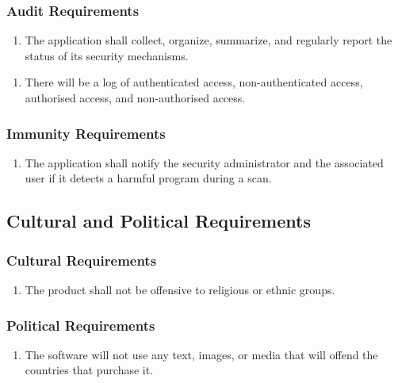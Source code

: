 \documentclass[]{article}
\begin{document}
\subsubsection{Audit Requirements}
\label{ssub:audit_requirements}
\begin{enumerate}[{SR}1. ]
	\item The application shall collect, organize, summarize, and regularly report the status of its security mechanisms.
\end{enumerate}
\begin{enumerate}[{SR}2. ]
	\item There will be a log of authenticated access, non-authenticated access, authorised access, and non-authorised access.
\end{enumerate}

\subsubsection{Immunity Requirements}
\label{ssub:immunity_requirements}
\begin{enumerate}[{SR}1. ]
	\item The application shall notify the security administrator and the associated user if it detects a harmful program during a scan.
\end{enumerate}


\subsection{Cultural and Political Requirements}
\label{sub:cultural_and_political_requirements}

\subsubsection{Cultural Requirements}
\label{ssub:cultural_requirements}
\begin{enumerate}[{CP}1. ]
	\item The product shall not be offensive to religious or ethnic groups.
\end{enumerate}

\subsubsection{Political Requirements}
\label{ssub:political_requirements}
\begin{enumerate}[{CP}1. ]
	\item The software will not use any text, images, or media that will offend the countries that purchase it.

\end{enumerate}
\end{document}
